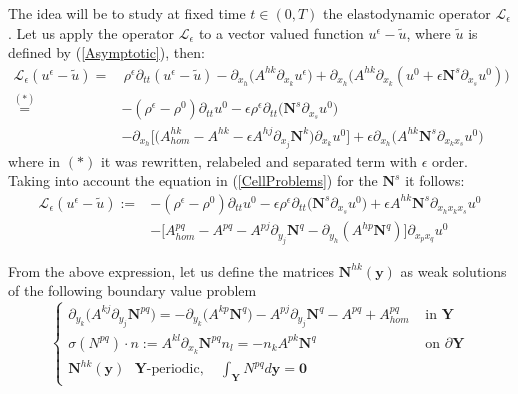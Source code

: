 The idea will be to study at fixed time $t \in (0,T)$ the elastodynamic operator $\mathcal{L}_{\epsilon}$.
Let us apply the operator $\mathcal{L}_{\epsilon}$ to a vector valued function $u^{\epsilon}-\tilde{u}$, where $\tilde{u}$ is defined by (\ref{Asymptotic}), then:
\begin{align*}
    \mathcal{L}_{\epsilon} (u^{\epsilon}-\tilde{u}) =&\, \rho^{\epsilon} \partial_{tt} (u^{\epsilon}-\tilde{u}) - \partial_{x_h} \big( A^{hk}\partial_{x_k} u^{\epsilon} \big) + \partial_{x_h} \big( A^{hk}\partial_{x_k} (u^0 + \epsilon \mathbf{N}^s \partial_{x_s}u^0 )\big) \\
    \overset{(*)}{=}& - (\rho^{\epsilon}-\rho^0) \partial_{tt} u^0 - \epsilon \rho^{\epsilon} \partial_{tt}\big(\mathbf{N}^s \partial_{x_s}u^0 \big)  \\
    & - \partial_{x_h} \big[ \big( A_{hom}^{hk} - A^{hk} - \epsilon A^{hj}\partial_{x_j} \mathbf{N}^k \big) \partial_{x_k} u^0 \big] + \epsilon \partial_{x_h} \big( A^{hk} \mathbf{N}^s \partial_{x_k x_s} u^0 \big) 
\end{align*}
where in $(*)$ it was rewritten, relabeled and separated term with $\epsilon$ order.
Taking into account the equation in (\ref{CellProblems}) for the $\mathbf{N}^s$ it follows:
\begin{align*}
    \mathcal{L}_{\epsilon} (u^{\epsilon} - \tilde{u})  :=& - (\rho^{\epsilon}-\rho^0) \partial_{tt} u^0 - \epsilon \rho^{\epsilon} \partial_{tt}\big(\mathbf{N}^s \partial_{x_s}u^0 \big) + \epsilon A^{hk}\mathbf{N}^s \partial_{x_h x_k x_s}u^0 \\
    & - \big[ A^{pq}_{hom} - A^{pq} - A^{pj} \partial_{y_j} \mathbf{N}^q - \partial_{y_h}(A^{hp} \mathbf{N}^q) \big] \partial_{x_p x_q} u^0 
    \end{align*}

From the above expression, let us define the matrices $\mathbf{N}^{hk}(\mathbf{y})$ as weak solutions of the following boundary value problem
\begin{equation}
    \label{SecondCellProblem}
    \left \{
    \begin{array}{cc}
        \partial_{y_k} \big( A^{kj}\partial_{y_j} \mathbf{N}^{pq}\big) = -\partial_{y_k} \big( A^{kp} \mathbf{N}^q\big) - A^{pj}\partial_{y_j} \mathbf{N}^q - A^{pq} + A^{pq}_{hom} & \text{ in } \mathbf{Y}\\
        \sigma(N^{pq})\cdot n := A^{kl}\partial_{x_k}\mathbf{N}^{pq}n_l = - n_k A^{pk}\mathbf{N}^q & \text{ on } \partial \mathbf{Y} \\
        \mathbf{N}^{hk}(\mathbf{y}) \text{ $\mathbf{Y}$-periodic}, \quad  \int_{\mathbf{Y}} N^{pq} d \mathbf{y} = \mathbf{0} &
    \end{array}
    \right .
\end{equation}

